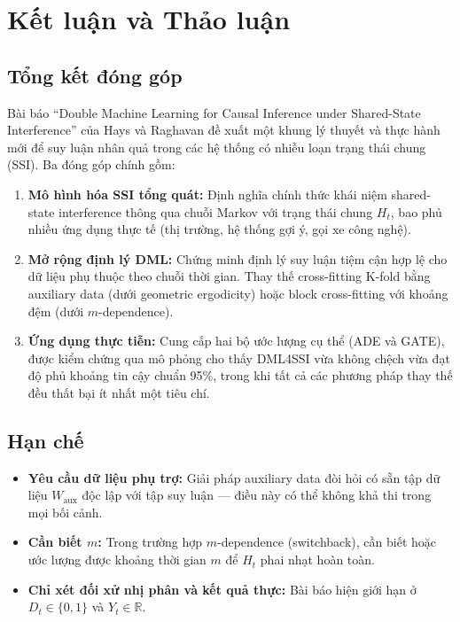 \section{Kết luận và Thảo luận}

\subsection{Tổng kết đóng góp}

Bài báo ``Double Machine Learning for Causal Inference under Shared-State Interference'' của Hays và Raghavan \cite{hays2025double} đề xuất một khung lý thuyết và thực hành mới để suy luận nhân quả trong các hệ thống có nhiễu loạn trạng thái chung (SSI). Ba đóng góp chính gồm:

\begin{enumerate}
    \item \textbf{Mô hình hóa SSI tổng quát:} Định nghĩa chính thức khái niệm shared-state interference thông qua chuỗi Markov với trạng thái chung \(H_t\), bao phủ nhiều ứng dụng thực tế (thị trường, hệ thống gợi ý, gọi xe công nghệ).

    \item \textbf{Mở rộng định lý DML:} Chứng minh định lý suy luận tiệm cận hợp lệ cho dữ liệu phụ thuộc theo chuỗi thời gian. Thay thế cross-fitting K-fold bằng auxiliary data (dưới geometric ergodicity) hoặc block cross-fitting với khoảng đệm (dưới \(m\)-dependence).

    \item \textbf{Ứng dụng thực tiễn:} Cung cấp hai bộ ước lượng cụ thể (ADE và GATE), được kiểm chứng qua mô phỏng cho thấy DML4SSI vừa không chệch vừa đạt độ phủ khoảng tin cậy chuẩn 95\%, trong khi tất cả các phương pháp thay thế đều thất bại ít nhất một tiêu chí.
\end{enumerate}

\subsection{Hạn chế}

\begin{itemize}
    \item \textbf{Yêu cầu dữ liệu phụ trợ:} Giải pháp auxiliary data đòi hỏi có sẵn tập dữ liệu \(W_{\text{aux}}\) độc lập với tập suy luận --- điều này có thể không khả thi trong mọi bối cảnh.
    \item \textbf{Cần biết \(m\):} Trong trường hợp \(m\)-dependence (switchback), cần biết hoặc ước lượng được khoảng thời gian \(m\) để \(H_t\) phai nhạt hoàn toàn.
    \item \textbf{Chỉ xét đối xử nhị phân và kết quả thực:} Bài báo hiện giới hạn ở \(D_t \in \{0, 1\}\) và \(Y_t \in \mathbb{R}\).
\end{itemize}

